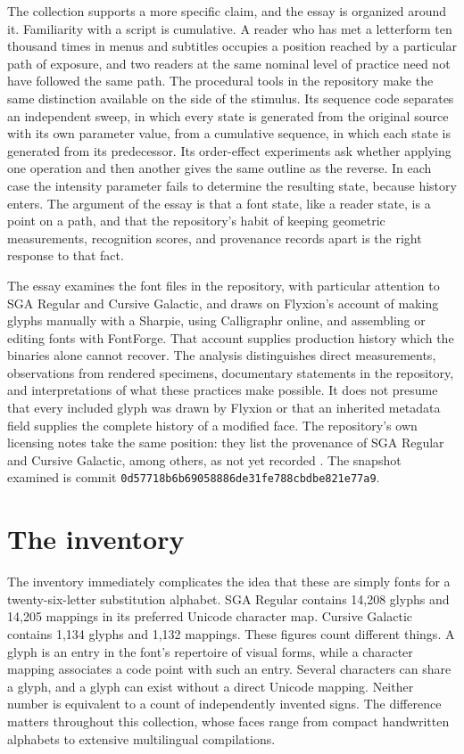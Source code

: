 \documentclass[11pt]{article}
\begin{document}
The collection supports a more specific claim, and the essay is organized around it. Familiarity with a script is cumulative. A reader who has met a letterform ten thousand times in menus and subtitles occupies a position reached by a particular path of exposure, and two readers at the same nominal level of practice need not have followed the same path. The procedural tools in the repository make the same distinction available on the side of the stimulus. Its sequence code separates an independent sweep, in which every state is generated from the original source with its own parameter value, from a cumulative sequence, in which each state is generated from its predecessor. Its order-effect experiments ask whether applying one operation and then another gives the same outline as the reverse. In each case the intensity parameter fails to determine the resulting state, because history enters. The argument of the essay is that a font state, like a reader state, is a point on a path, and that the repository's habit of keeping geometric measurements, recognition scores, and provenance records apart is the right response to that fact.

The essay examines the font files in the repository, with particular attention to SGA Regular and Cursive Galactic, and draws on Flyxion's account of making glyphs manually with a Sharpie, using Calligraphr online, and assembling or editing fonts with FontForge. That account supplies production history which the binaries alone cannot recover. The analysis distinguishes direct measurements, observations from rendered specimens, documentary statements in the repository, and interpretations of what these practices make possible. It does not presume that every included glyph was drawn by Flyxion or that an inherited metadata field supplies the complete history of a modified face. The repository's own licensing notes take the same position: they list the provenance of SGA Regular and Cursive Galactic, among others, as not yet recorded \cite{repo}. The snapshot examined is commit \texttt{0d57718b6b69058886de31fe788cbdbe821e77a9}.

\section{The inventory}

The inventory immediately complicates the idea that these are simply fonts for a twenty-six-letter substitution alphabet. SGA Regular contains 14,208 glyphs and 14,205 mappings in its preferred Unicode character map. Cursive Galactic contains 1,134 glyphs and 1,132 mappings. These figures count different things. A glyph is an entry in the font's repertoire of visual forms, while a character mapping associates a code point with such an entry. Several characters can share a glyph, and a glyph can exist without a direct Unicode mapping. Neither number is equivalent to a count of independently invented signs. The difference matters throughout this collection, whose faces range from compact handwritten alphabets to extensive multilingual compilations.
\end{document}
